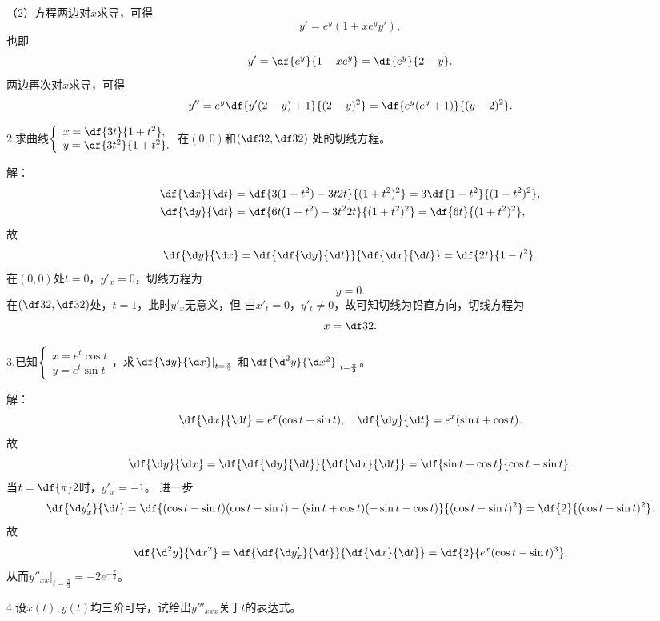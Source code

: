 （2）方程两边对$x$求导，可得
$$y'=e^y(1+xe^yy'),$$
也即
$$y'=\df{e^y}{1-xe^y}=\df{e^y}{2-y}.$$
两边再次对$x$求导，可得
$$y''=e^y\df{y'(2-y)+1}{(2-y)^2}=\df{e^y(e^y+1)}{(y-2)^2}.$$
\fin

\bigskip

2.求曲线$\left\{\begin{array}{l}
x=\df{3t}{1+t^2},\\ y=\df{3t^2}{1+t^2}.
\end{array}\right.$在$(0,0)$和$\left(\df32,\df32\right)$
处的切线方程。

解：
\begin{align*}
	\df{\d x}{\d t}&=\df{3(1+t^2)-3t2t}{(1+t^2)^2}=3\df{1-t^2}{(1+t^2)^2},\\
	\df{\d y}{\d t}&=\df{6t(1+t^2)-3t^22t}{(1+t^2)^2}
	=\df{6t}{(1+t^2)^2},
\end{align*}
故
$$\df{\d y}{\d x}=\df{\df{\d y}{\d t}}{\df{\d x}{\d t}}
=\df{2t}{1-t^2}.$$
在$(0,0)$处$t=0$，$y'_x=0$，切线方程为
$$y=0.$$
在$\left(\df32,\df32\right)$处，$t=1$，此时$y'_x$无意义，但
由$x'_t=0$，$y'_t\ne 0$，故可知切线为铅直方向，切线方程为
$$x=\df32.$$
\fin

\bigskip

3.已知$\left\{\begin{array}{l}
  	x=e^t\cos t\\ y=e^t\sin t
\end{array}\right.$，求$\left.\df{\d y}{\d x}\right|_{t=\frac{\pi}2}$
和$\left.\df{\d^2 y}{\d x^2}\right|_{t=\frac{\pi}2}$。

解：
$$\df{\d x}{\d t}=e^x(\cos t-\sin t),\quad
\df{\d y}{\d t}=e^x(\sin t+\cos t).$$
故
$$\df{\d y}{\d x}=\df{\df{\d y}{\d t}}{\df{\d x}{\d t}}
=\df{\sin t+\cos t}{\cos t-\sin t}.$$
当$t=\df{\pi}2$时，$y'_x=-1$。
进一步
$$\df{\d y'_x}{\d t}=\df{(\cos t-\sin t)(\cos t-\sin t)
-(\sin t+\cos t)(-\sin t-\cos t)}{(\cos t-\sin t)^2}
=\df{2}{(\cos t-\sin t)^2}.$$
故
$$\df{\d^2 y}{\d x^2}
=\df{\df{\d y'_x}{\d t}}{\df{\d x}{\d t}}
=\df{2}{e^x(\cos t-\sin t)^3},$$
从而$y''_{xx}|_{t=\frac{\pi}2}=-2e^{-\frac{\pi}2}$。
\fin

\bigskip

4.设$x(t),y(t)$均三阶可导，试给出$y'''_{xxx}$关于$t$的表达式。

